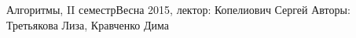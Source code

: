 


\BigHeader
	{Алгоритмы, II семестр}{Весна 2015, лектор: Копелиович Сергей }
	{Авторы: Третьякова Лиза, Кравченко Дима}




